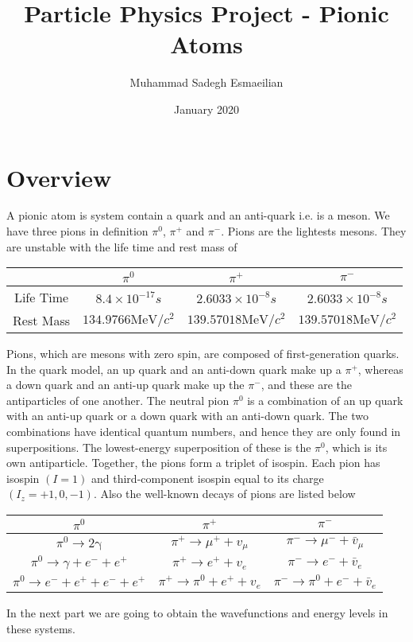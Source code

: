 \documentclass{article}
\title{Particle Physics Project - Pionic Atoms}
\author{Muhammad Sadegh Esmaeilian}
\date{January 2020}
\begin{document}
\maketitle

\section{Overview}
A pionic atom is system contain a quark and an anti-quark i.e. is a meson. We have three pions in definition \(\pi^{0}\), \(\pi^{+}\) and \(\pi^{-}\). Pions are the lightests mesons. They are unstable with the life time and rest mass of 

\begin{center}
\begin{tabular}{ c | c c c }
 & $\pi^{0}$ & $\pi^{+}$ & $\pi^{-}$ \\
 \hline 
Life Time & $8.4 \times 10^{-17} s$ & $2.6033 \times 10^{-8} s$ & $2.6033 \times 10^{-8} s$\\  
Rest Mass & $134.9766 \mathrm{MeV} / c^{2}$ & $139.57018 \mathrm{MeV} / c^{2}$ & $139.57018 \mathrm{MeV} / c^{2}$
\end{tabular}
\end{center}
Pions, which are mesons with zero spin, are composed of first-generation quarks. In the quark model, an up quark and an anti-down quark make up a \(\pi^{+}\), whereas a down quark and an anti-up quark make up the \(\pi^{-}\), and these are the antiparticles of one another. The neutral pion \(\pi^{0}\) is a combination of an up quark with an anti-up quark or a down quark with an anti-down quark. 
The two combinations have identical quantum numbers, and hence they are only found in superpositions. The lowest-energy superposition of these is the \(\pi^{0}\), which is its own antiparticle. Together, the pions form a triplet of isospin. Each pion has isospin \((I = 1)\) and third-component isospin equal to its charge \((I_{z} = +1, 0, −1)\). 
Also the well-known decays of pions are listed below

\begin{center}
\begin{tabular}{ c | c | c }
$\pi^{0}$ & $\pi^{+}$ & $\pi^{-}$ \\
 \hline 
$\pi^{0} \rightarrow 2 \mathrm{\gamma}$ & $\pi^{+} \rightarrow \mu^{+}+v_{\mu}$ & $\pi^{-} \rightarrow \mu^{-}+\bar{v}_{\mu}$\\  
$\pi^{0} \rightarrow \gamma+e^{-}+e^{+}$ & $\pi^{+} \rightarrow e^{+}+{v}_{e}$ & $\pi^{-} \rightarrow e^{-}+\bar{v}_{e}$\\
$\pi^{0} \rightarrow e^{-}+e^{+}+e^{-}+e^{+}$ & $\pi^{+} \rightarrow \pi^{0}+e^{+}+v_{e}$ & $\pi^{-} \rightarrow \pi^{0}+e^{-}+\bar{v}_{e}$
\end{tabular}
\end{center}
In the next part we are going to obtain the wavefunctions and energy levels in these systems.
\end{document}
